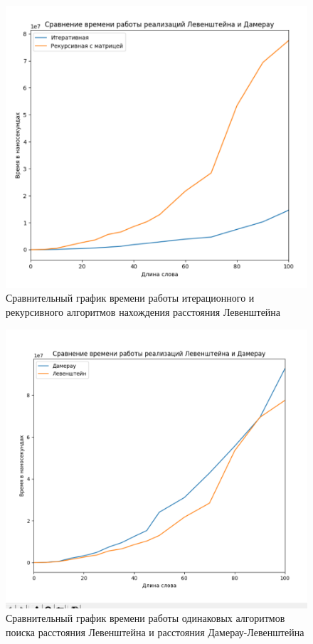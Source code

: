 \begin{figure}[hp]
    \centering
    \includegraphics[width=\linewidth]{inc/compare1.png}
    \caption{Сравнительный график времени работы итерационного и рекурсивного алгоритмов нахождения расстояния Левенштейна}
\end{figure}
\clearpage

\begin{figure}[hp]
    \centering
    \includegraphics[width=\linewidth]{inc/compare2.png}
    \caption{Сравнительный график времени работы одинаковых алгоритмов поиска расстояния Левенштейна и расстояния Дамерау-Левенштейна}
\end{figure}
\clearpage
